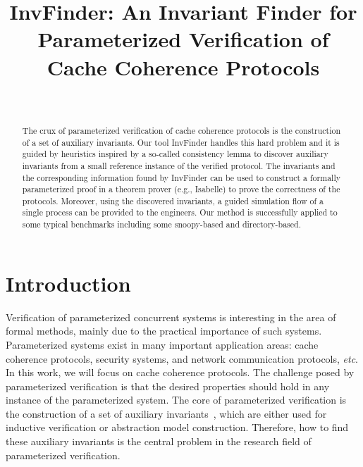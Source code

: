 \documentclass{llncs}
\begin{document}
\title{ {\sf InvFinder}: An Invariant Finder for Parameterized Verification of Cache Coherence Protocols}
\author{~}
\authorrunning{~}
\institute{~}

\maketitle

\begin{abstract}
The crux of parameterized verification of cache coherence protocols
is the construction of a set of auxiliary invariants. Our tool  {\sf
InvFinder} handles this hard problem and it is guided by heuristics
inspired by a so-called consistency lemma to discover auxiliary
invariants from a small reference instance of the verified protocol.
The invariants and the corresponding information found by {\sf
InvFinder} can be used to construct a formally parameterized proof
in a theorem prover (e.g., Isabelle) to prove the correctness of the
protocols. Moreover, using the discovered invariants, a guided
simulation flow of a single process can be provided to the
engineers. Our method is successfully applied to some typical
benchmarks including some snoopy-based and directory-based.

\end{abstract}

\section{Introduction}
Verification of parameterized concurrent systems is interesting in
the area of formal methods, mainly due to the practical importance
of such systems. Parameterized systems exist in many important
application areas: cache coherence protocols, security systems, and
network communication protocols, \emph{etc}. In this work, we will
focus on cache coherence protocols. The challenge posed by
parameterized verification is that the desired properties should
hold in any instance of the parameterized system. The core of
parameterized verification is the construction of a set of auxiliary
invariants~\cite{Pnueli2001,Chou2004,Pandav2005,cubicle2011}, which
are either used for inductive verification or abstraction model
construction. Therefore, how to find these auxiliary invariants is
the central problem in the research field of parameterized
verification.
\end{document}
